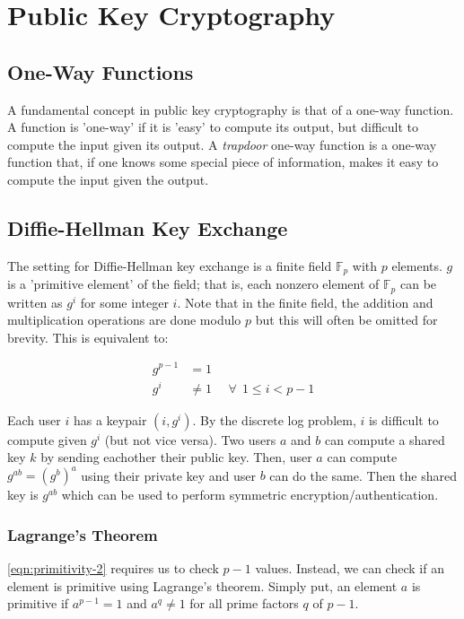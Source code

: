 \documentclass[11pt]{report}
\begin{document}
\section{Public Key Cryptography}
\subsection{One-Way Functions}
A fundamental concept in public key cryptography is that of a one-way function. A function is 'one-way' if it is 'easy' to compute its output, but difficult to compute the input given its output. A \textit{trapdoor} one-way function is a one-way function that, if one knows some special piece of information, makes it easy to compute the input given the output.


\subsection{Diffie-Hellman Key Exchange}
The setting for Diffie-Hellman key exchange is a finite field $\mathbb{F}_p$ with $p$ elements. $g$ is a 'primitive element' of the field; that is, each nonzero element of $\mathbb{F}_p$ can be written as $g^i$ for some integer $i$. Note that in the finite field, the addition and multiplication operations are done modulo $p$ but this will often be omitted for brevity. This is equivalent to:

\begin{align}
	\label{eqn:primitivity-1}
	g^{p-1} &= 1\\
	\label{eqn:primitivity-2}
	g^{i} &\neq 1 \ \ \ \ \ \ \forall \ \ 1 \le i < p - 1
\end{align}

Each user $i$ has a keypair $(i, g^i)$. By the discrete log problem, $i$ is difficult to compute given $g^i$ (but not vice versa). Two users $a$ and $b$ can compute a shared key $k$ by sending eachother their public key. Then, user $a$ can compute $g^{ab} = (g^b)^a$ using their private key and user $b$ can do the same. Then the shared key is $g^{ab}$ which can be used to perform symmetric encryption/authentication.

\subsubsection{Lagrange's Theorem}
\autoref{eqn:primitivity-2} requires us to check $p-1$ values. Instead, we can check if an element is primitive using Lagrange's theorem. Simply put, an element $a$ is primitive if $a^{p-1}=1$ and $a^{q} \neq 1$ for all prime factors $q$ of $p-1$.
\end{document}
